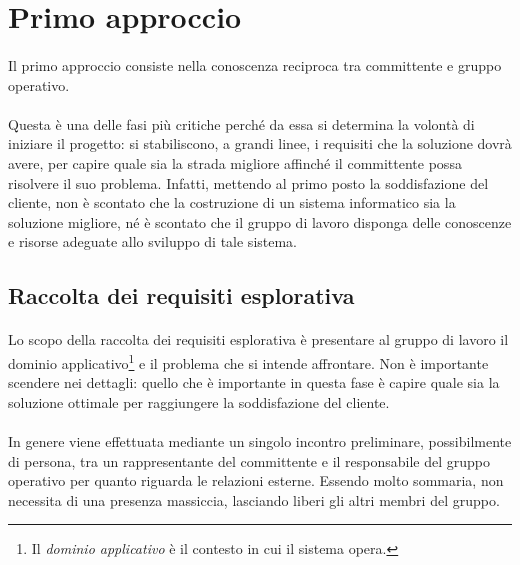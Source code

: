\documentclass[11pt,a4paper,english]{article}
\begin{document}
\newpage
\section{Primo approccio}

\paragraph{} Il primo approccio consiste nella conoscenza reciproca tra committente e gruppo operativo. 

\paragraph{} Questa è una delle fasi più critiche perché da essa si determina la volontà di iniziare il progetto: si stabiliscono, a grandi linee, i requisiti che la soluzione dovrà avere, per capire quale sia la strada migliore affinché il committente possa risolvere il suo problema. Infatti, mettendo al primo posto la soddisfazione del cliente, non è scontato che la costruzione di un sistema informatico sia la soluzione migliore, né è scontato che il gruppo di lavoro disponga delle conoscenze e risorse adeguate allo sviluppo di tale sistema. 


\subsection{Raccolta dei requisiti esplorativa}

\paragraph{} Lo scopo della raccolta dei requisiti esplorativa è presentare al gruppo di lavoro il dominio applicativo\footnote{Il \emph{dominio applicativo} è il contesto in cui il sistema opera.} e il problema che si intende affrontare. Non è importante scendere nei dettagli: quello che è importante in questa fase è capire quale sia la soluzione ottimale per raggiungere la soddisfazione del cliente. 

\paragraph{} In genere viene effettuata mediante un singolo incontro preliminare, possibilmente di persona, tra un rappresentante del committente e il responsabile del gruppo operativo per quanto riguarda le relazioni esterne. Essendo molto sommaria, non necessita di una presenza massiccia, lasciando liberi gli altri membri del gruppo. 
\end{document}
